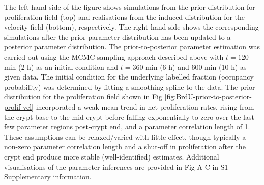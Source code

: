 \documentclass[10pt,letterpaper]{article}
\begin{document}
The left-hand side of the figure shows simulations from the prior
distribution for proliferation field (top) and realisations from the
induced distribution for the velocity field (bottom), respectively. The
right-hand side shows the corresponding simulations after the prior
parameter distribution has been updated to a posterior parameter
distribution. The prior-to-posterior parameter estimation was carried
out using the MCMC sampling approach described above with \(t = 120\)
min (2 h) as an initial condition and \(t = 360\) min (6 h) and \(600\)
min (10 h) as given data. The initial condition for the underlying
labelled fraction (occupancy probability) was determined by fitting a
smoothing spline to the data. The prior distribution for the
proliferation field shown in Fig
\ref{fig:BrdU-prior-to-posterior-prolif-vel} incorporated a weak mean
trend in net proliferation rates, rising from the crypt base to the
mid-crypt before falling exponentially to zero over the last few
parameter regions post-crypt end, and a parameter correlation length of
1. These assumptions can be relaxed/varied with little effect, though
typically a non-zero parameter correlation length and a shut-off in
proliferation after the crypt end produce more stable (well-identified)
estimates. Additional visualisations of the parameter inferences are
provided in Fig A-C in S1 Supplementary information.
\end{document}
